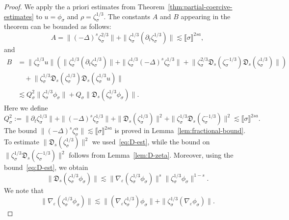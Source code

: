 \documentclass{article}
\numberwithin{equation}{section}
\newcommand{\assign}{:=}
\theoremstyle{plain}
\theoremstyle{definition}
\begin{document}
\begin{proof}
  We apply the a priori estimates from
  Theorem~\ref{thm:partial-coercive-estimates} to $u = \phi_{\sigma}$ and
  $\rho = \zeta_{\sigma}^{1 / 3}$. The constants $A$ and $B$ appearing in the
  theorem can be bounded as follows:
  \[ A = \| (- \Delta)^s \zeta_{\sigma}^{2 / 3} \| + \| \zeta_{\sigma}^{1 / 3}
     (\partial_t \zeta_{\sigma}^{1 / 3}) \| \lesssim \llbracket \sigma
     \rrbracket^{2 s a}, \]
  and
  \begin{align*}
    B &=  \| \zeta_{\sigma}^{1 / 3} u \|
    \left( \| \zeta_{\sigma}^{1 / 3}(\partial_t \zeta_{\sigma}^{1 / 3}) \|
    + \| \zeta_{\sigma}^{1 / 3} (-\Delta)^s \zeta_{\sigma}^{1 / 3} \|
    + \big\| \zeta_{\sigma}^{2 / 3}
    \mathfrak{D}_s \left( {\zeta_{\sigma}^{- 1 / 3}}  \right)
    \mathfrak{D}_s(\zeta_{\sigma}^{1 / 3}) \big\| \right)\\
    &\quad + \big\| {\zeta_{\sigma}^{1 / 3}}
    \mathfrak{D}_s(\zeta_{\sigma}^{1 / 3})
    \mathfrak{D}_s(\zeta_{\sigma}^{1 / 3} u) \big\|\\[3pt]
    &\lesssim Q^2_{\sigma}  \| \zeta_{\sigma}^{1 / 3} \phi_{\sigma} \|
    + Q_{\sigma}  \| \mathfrak{D}_s(\zeta_{\sigma}^{1 / 3} \phi_{\sigma}) \| .
  \end{align*}
  Here we define
  \[ Q_{\sigma}^2 \assign \| \partial_t \zeta_{\sigma}^{1 / 3} \| + \| (-
     \Delta)^s \zeta_{\sigma}^{1 / 3} \| + \| \mathfrak{D}_s
     (\zeta_{\sigma}^{1 / 3}) \|^2 + \| \zeta_{\sigma}^{1 / 3} \mathfrak{D}_s
     (\zeta_{\sigma}^{- 1 / 3}) \|^2 \lesssim \llbracket \sigma \rrbracket^{2
     s a} . \]
  The bound $\| (- \Delta)^s \zeta_{\sigma}^{\alpha} \|
  \lesssim \llbracket \sigma \rrbracket^{2 s a}$ is proved in
  Lemma~\ref{lem:fractional-bound}. To estimate $\| \mathfrak{D}_s
  (\zeta_{\sigma}^{1 / 3}) \|^2$ we used~\eqref{eq:D-est}, while the bound on
  $\| \zeta_{\sigma}^{1 / 3} \mathfrak{D}_s (\zeta_{\sigma}^{- 1 / 3}) \|^2$
  follows from Lemma~\ref{lem:D-zeta}. Moreover, using the
  bound~\eqref{eq:D-est}, we obtain
  \begin{equation}
    \| \mathfrak{D}_s (\zeta_{\sigma}^{1 / 3} \phi_{\sigma}) \| \lesssim \|
    \nabla_{\varepsilon} (\zeta_{\sigma}^{1 / 3} \phi_{\sigma}) \|^s  \|
    \zeta_{\sigma}^{1 / 3} \phi_{\sigma} \|^{1 - s} . \label{eq:D-proof-est}
  \end{equation}
  We note that
  \[ \| \nabla_{\varepsilon} (\zeta_{\sigma}^{1 / 3} \phi_{\sigma}) \|
     \lesssim \| (\nabla_{\varepsilon} \zeta_{\sigma}^{1 / 3}) \phi_{\sigma}
     \| + \| \zeta_{\sigma}^{1 / 3}  (\nabla_{\varepsilon} \phi_{\sigma}) \| .
\]
\end{proof}
\end{document}
